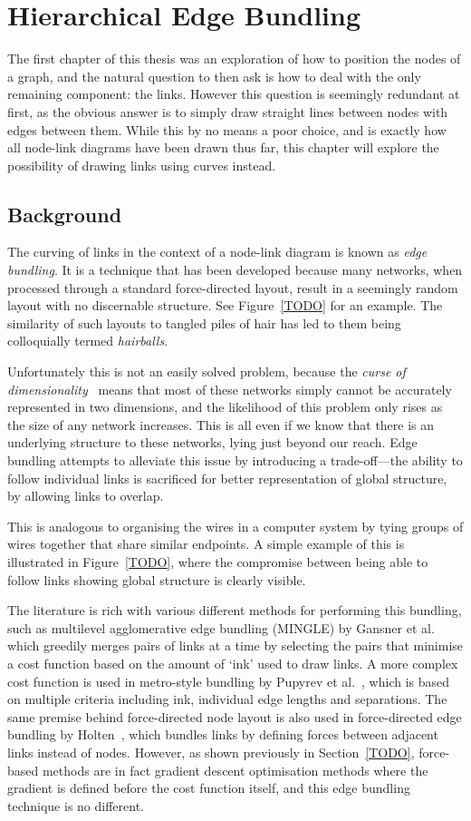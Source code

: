 \chapter{Hierarchical Edge Bundling}
The first chapter of this thesis was an exploration of how to position the nodes of a graph, and the natural question to then ask is how to deal with the only remaining component: the links. However this question is seemingly redundant at first, as the obvious answer is to simply draw straight lines between nodes with edges between them. While this by no means a poor choice, and is exactly how all node-link diagrams have been drawn thus far, this chapter will explore the possibility of drawing links using curves instead.

\section{Background}
The curving of links in the context of a node-link diagram is known as \textit{edge bundling}. It is a technique that has been developed because many networks, when processed through a standard force-directed layout, result in a seemingly random layout with no discernable structure. See Figure~\ref{TODO} for an example. The similarity of such layouts to tangled piles of hair has led to them being colloquially termed \textit{hairballs}.

Unfortunately this is not an easily solved problem, because the \textit{curse of dimensionality}~\cite{TODO} means that most of these networks simply cannot be accurately represented in two dimensions, and the likelihood of this problem only rises as the size of any network increases. This is all even if we know that there is an underlying structure to these networks, lying just beyond our reach.
Edge bundling attempts to alleviate this issue by introducing a trade-off---the ability to follow individual links is sacrificed for better representation of global structure, by allowing links to overlap.

This is analogous to organising the wires in a computer system by tying groups of wires together that share similar endpoints. A simple example of this is illustrated in Figure~\ref{TODO}, where the compromise between being able to follow links showing global structure is clearly visible.

The literature is rich with various different methods for performing this bundling, such as multilevel agglomerative edge bundling (MINGLE) by Gansner et al.~\cite{TODO} which greedily merges pairs of links at a time by selecting the pairs that minimise a cost function based on the amount of `ink' used to draw links. A more complex cost function is used in metro-style bundling by Pupyrev et al.~\cite{TODO}, which is based on multiple criteria including ink, individual edge lengths and separations. 
The same premise behind force-directed node layout is also used in force-directed edge bundling by Holten~\cite{TODO}, which bundles links by defining forces between adjacent links instead of nodes. However, as shown previously in Section~\ref{TODO}, force-based methods are in fact gradient descent optimisation methods where the gradient is defined before the cost function itself, and this edge bundling technique is no different.

